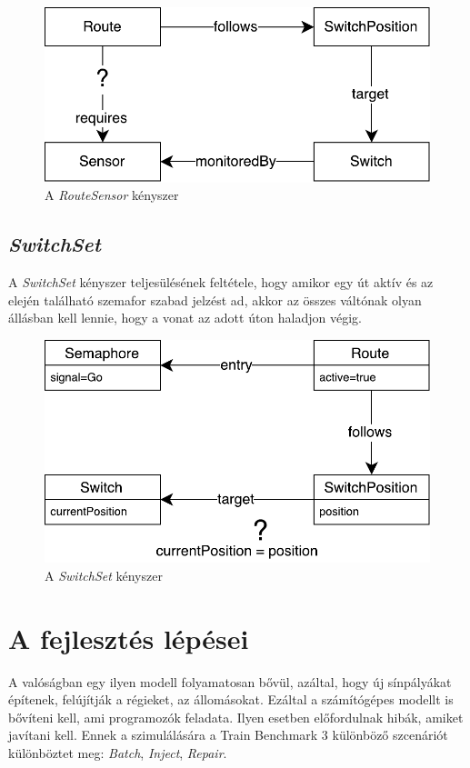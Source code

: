 \begin{figure}[!ht]
	\centering
	\includegraphics[width=0.7\linewidth, keepaspectratio]{figures/RouteSensor.pdf}
	\caption{A \emph{RouteSensor} kényszer}
	\label{fig:RouteSensor}
\end{figure}

\subsection{\emph{SwitchSet}}

A \emph{SwitchSet} kényszer teljesülésének feltétele, hogy amikor egy út aktív és az elején található szemafor szabad jelzést ad, akkor az összes váltónak olyan állásban kell lennie, hogy a vonat az adott úton haladjon végig.

\begin{figure}[!ht]
	\centering
	\includegraphics[width=0.7\linewidth, keepaspectratio]{figures/SwitchSet.pdf}
	\caption{A \emph{SwitchSet} kényszer}
	\label{fig:SwitchSet}
\end{figure}


\section{A fejlesztés lépései}

A valóságban egy ilyen modell folyamatosan bővül, azáltal, hogy új sínpályákat építenek, felújítják a régieket, az állomásokat. Ezáltal a számítógépes modellt is bővíteni kell, ami programozók feladata. Ilyen esetben előfordulnak hibák, amiket javítani kell. Ennek a szimulálására a Train Benchmark 3 különböző szcenáriót különböztet meg: \emph{Batch}, \emph{Inject}, \emph{Repair}.

